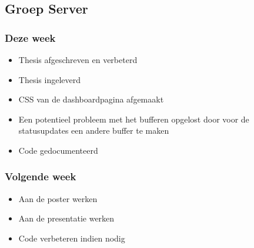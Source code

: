 \subsection*{Groep Server}
\subsubsection*{Deze week}
\begin{itemize}
\item Thesis afgeschreven en verbeterd
\item Thesis ingeleverd
\item CSS van de dashboardpagina afgemaakt
\item Een potentieel probleem met het bufferen opgelost door voor de statusupdates een andere buffer te maken
\item Code gedocumenteerd
\end{itemize}
\subsubsection*{Volgende week}
\begin{itemize}
\item Aan de poster werken
\item Aan de presentatie werken
\item Code verbeteren indien nodig
\end{itemize}
